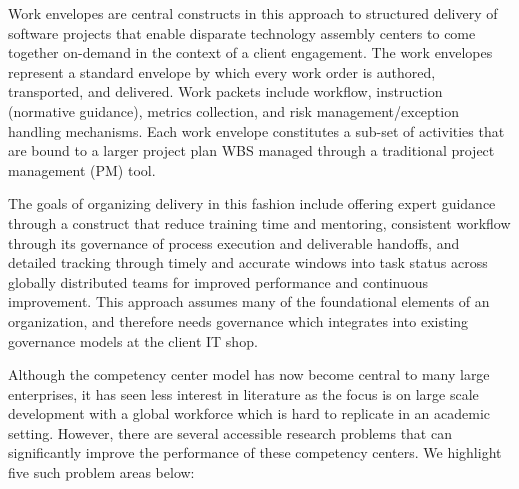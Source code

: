 Work envelopes are central constructs in this approach to structured delivery of software projects that enable disparate technology assembly centers to come together on-demand in the context of a client engagement.  The work envelopes represent a standard envelope by which every work order is authored, transported, and delivered. Work packets include workflow, instruction (normative guidance), metrics collection, and risk management/exception handling mechanisms. Each work envelope constitutes a sub-set of activities that are bound to a larger project plan WBS managed through a traditional project management (PM) tool. 

The goals of organizing delivery in this fashion include offering expert guidance through a construct that reduce training time and mentoring, consistent workflow through its governance of process execution and deliverable handoffs, and detailed tracking through timely and accurate windows into task status across globally distributed teams for improved performance and continuous improvement. This approach assumes many of the foundational elements of an organization, and therefore needs governance which integrates into existing governance models at the client IT shop.

Although the competency center model has now become central to many large enterprises, it has seen less interest in literature as the focus is on large scale development with a global workforce which is hard to replicate in an academic setting. However, there are several accessible research problems that can significantly improve the performance of these competency centers. We highlight five such problem areas below:

